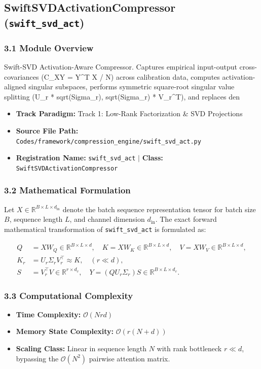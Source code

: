 \subsection{SwiftSVDActivationCompressor (\texttt{swift\_svd\_act})}
\label{sec:app_module_swift_svd_act}

\subsubsection*{3.1 Module Overview}
Swift-SVD Activation-Aware Compressor.  Captures empirical input-output cross-covariances (C\_XY = Y^T X / N) across calibration data, computes activation-aligned singular subspaces, performs symmetric square-root singular value splitting (U\_r * sqrt(Sigma\_r), sqrt(Sigma\_r) * V\_r^T), and replaces den
\begin{itemize}
    \item \textbf{Track Paradigm:} Track 1: Low-Rank Factorization & SVD Projections
    \item \textbf{Source File Path:} \texttt{Codes/framework/compression\_engine/swift\_svd\_act.py}
    \item \textbf{Registration Name:} \texttt{swift\_svd\_act} $\mid$ \textbf{Class:} \texttt{SwiftSVDActivationCompressor}
\end{itemize}

\subsubsection*{3.2 Mathematical Formulation}
Let $X \in \mathbb{R}^{B \times L \times d_{\text{in}}}$ denote the batch sequence representation tensor for batch size $B$, sequence length $L$, and channel dimension $d_{\text{in}}$. The exact forward mathematical transformation of \texttt{swift\_svd\_act} is formulated as:

\begin{align}
Q &= X W_Q \in \mathbb{R}^{B \times L \times d}, \quad K = X W_K \in \mathbb{R}^{B \times L \times d}, \quad V = X W_V \in \mathbb{R}^{B \times L \times d}, \\
K_r &= U_r \Sigma_r V_r^\top \approx K, \quad (r \ll d), \\
S &= V_r^\top V \in \mathbb{R}^{r \times d_v}, \quad Y = (Q U_r \Sigma_r) S \in \mathbb{R}^{B \times L \times d_v}.
\end{align}


\subsubsection*{3.3 Computational Complexity}
\begin{itemize}
    \item \textbf{Time Complexity:} $\mathcal{O}(N r d)$
    \item \textbf{Memory State Complexity:} $\mathcal{O}(r(N + d))$
    \item \textbf{Scaling Class:} Linear in sequence length $N$ with rank bottleneck $r \ll d$, bypassing the $\mathcal{O}(N^2)$ pairwise attention matrix.
\end{itemize}

